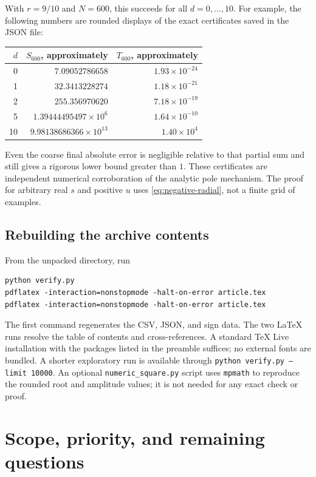 \documentclass[11pt,letterpaper]{article}
\theoremstyle{definition}
\numberwithin{equation}{section}
\begin{document}
With $r=9/10$ and $N=600$, this succeeds for all $d=0,\ldots,10$.
For example, the following numbers are rounded displays of the exact
certificates saved in the JSON file:
\begin{center}
\begin{tabular}{rrr}
\toprule
$d$ & $S_{600}$, approximately & $T_{600}$, approximately\\
\midrule
0 & $7.09052786658$ & $1.93\times10^{-24}$\\
1 & $32.3413228274$ & $1.18\times10^{-21}$\\
2 & $255.356970620$ & $7.18\times10^{-19}$\\
5 & $1.39444495497\times10^6$ & $1.64\times10^{-10}$\\
10 & $9.98138686366\times10^{13}$ & $1.40\times10^4$\\
\bottomrule
\end{tabular}
\end{center}
Even the coarse final absolute error is negligible relative to that
partial sum and still gives a rigorous lower bound greater than $1$.
These certificates are independent numerical corroboration of the
analytic pole mechanism. The proof for arbitrary real $s$ and positive
$u$ uses \eqref{eq:negative-radial}, not a finite grid of examples.

\subsection{Rebuilding the archive contents}

From the unpacked directory, run
\begin{verbatim}
python verify.py
pdflatex -interaction=nonstopmode -halt-on-error article.tex
pdflatex -interaction=nonstopmode -halt-on-error article.tex
\end{verbatim}
The first command regenerates the CSV, JSON, and sign data. The two LaTeX
runs resolve the table of contents and cross-references. A standard TeX
Live installation with the packages listed in the preamble suffices;
no external fonts are bundled. A shorter exploratory run is available
through \texttt{python verify.py --limit 10000}.
An optional \texttt{numeric\_square.py} script uses \texttt{mpmath} to
reproduce the rounded root and amplitude values; it is not needed for
any exact check or proof.

\section{Scope, priority, and remaining questions}
\label{sec:scope}
\end{document}
